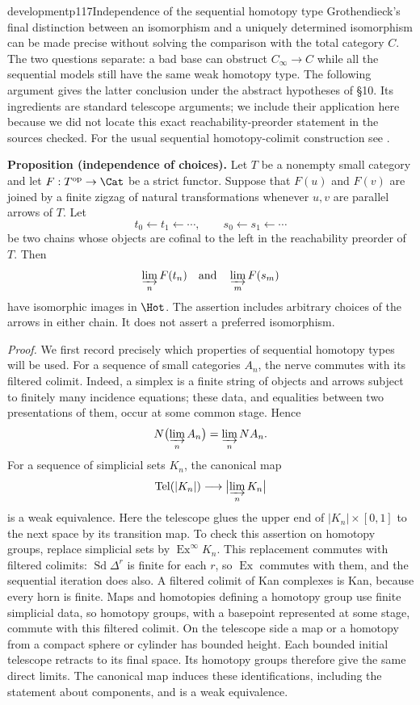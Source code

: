 \begin{dcomment}{development}{p117}{Independence of the sequential homotopy type}
Grothendieck's final distinction between an isomorphism and a uniquely determined isomorphism can be made precise without solving the comparison with the total category $C$.  The two questions separate: a bad base can obstruct $C_\infty\to C$ while all the sequential models still have the same weak homotopy type.  The following argument gives the latter conclusion under the abstract hypotheses of \S10.  Its ingredients are standard telescope arguments; we include their application here because we did not locate this exact reachability-preorder statement in the sources checked.  For the usual sequential homotopy-colimit construction see \citet[\S14.9, Proposition~14.10 and Corollary~14.11]{DuggerHocolim}.

\textbf{Proposition (independence of choices).}\ours\quad
Let $T$ be a nonempty small category and let $F:T^{\mathrm{op}}\to\Cat$ be a strict functor.  Suppose that $F(u)$ and $F(v)$ are joined by a finite zigzag of natural transformations whenever $u,v$ are parallel arrows of $T$.  Let
\[
 t_0\longleftarrow t_1\longleftarrow\cdots,
 \qquad s_0\longleftarrow s_1\longleftarrow\cdots
\]
be two chains whose objects are cofinal to the left in the reachability preorder of $T$.  Then
\[
 \varinjlim_n F(t_n)\quad\hbox{and}\quad\varinjlim_m F(s_m)
\]
have isomorphic images in $\Hot$.  The assertion includes arbitrary choices of the arrows in either chain.  It does not assert a preferred isomorphism.

\textit{Proof.}
We first record precisely which properties of sequential homotopy types will be used.  For a sequence of small categories $A_n$, the nerve commutes with its filtered colimit.  Indeed, a simplex is a finite string of objects and arrows subject to finitely many incidence equations; these data, and equalities between two presentations of them, occur at some common stage.  Hence
\[
 N\bigl(\varinjlim_n A_n\bigr)=\varinjlim_n N A_n.
\]
For a sequence of simplicial sets $K_n$, the canonical map
\[
 \operatorname{Tel}(|K_n|)\longrightarrow
       \bigl|\varinjlim_n K_n\bigr|
\]
is a weak equivalence.  Here the telescope glues the upper end of
$|K_n|\times[0,1]$ to the next space by its transition map.  To check this assertion on homotopy groups, replace simplicial sets by $\operatorname{Ex}^{\infty}K_n$.  This replacement commutes with filtered colimits: $\operatorname{Sd}\Delta^r$ is finite for each $r$, so $\operatorname{Ex}$ commutes with them, and the sequential iteration does also.  A filtered colimit of Kan complexes is Kan, because every horn is finite.  Maps and homotopies defining a homotopy group use finite simplicial data, so homotopy groups, with a basepoint represented at some stage, commute with this filtered colimit.  On the telescope side a map or a homotopy from a compact sphere or cylinder has bounded height.  Each bounded initial telescope retracts to its final space.  Its homotopy groups therefore give the same direct limits.  The canonical map induces these identifications, including the statement about components, and is a weak equivalence.


\end{dcomment}
